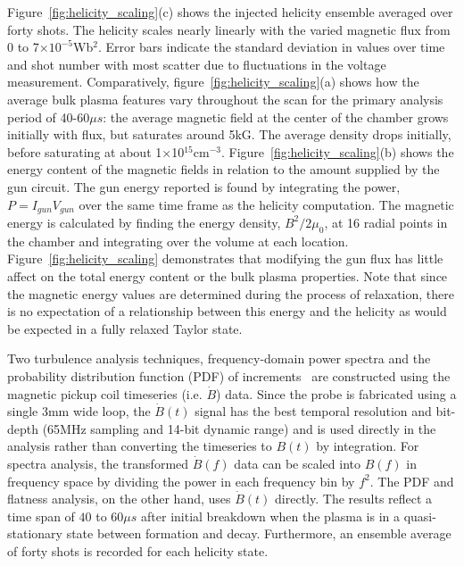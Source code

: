 \documentclass[aps,prl,amsmath,amssymb,reprint,superscriptaddress]{revtex4-1} %
\begin{document}
Figure~\ref{fig:helicity_scaling}(c) shows the injected helicity ensemble averaged over forty shots. The helicity scales nearly linearly with the varied magnetic flux from 0 to 7$\times 10^{-5}$Wb$^2$. Error bars indicate the standard deviation in values over time and shot number with most scatter due to fluctuations in the voltage measurement. Comparatively, figure~\ref{fig:helicity_scaling}(a) shows how the average bulk plasma features vary throughout the scan for the primary analysis period of 40-60$\mu s$: the average magnetic field at the center of the chamber grows initially with flux, but saturates around 5kG. The average density drops initially, before saturating at about 1$\times$10$^{15}$cm$^{-3}$. Figure~\ref{fig:helicity_scaling}(b) shows the energy content of the magnetic fields in relation to the amount supplied by the gun circuit. The gun energy reported is found by integrating the power, $P = I_{gun}V_{gun}$ over the same time frame as the helicity computation. The magnetic energy is calculated by finding the energy density, $B^{2}/2\mu_{0}$, at 16 radial points in the chamber and integrating over the volume at each location. Figure~\ref{fig:helicity_scaling} demonstrates that modifying the gun flux has little affect on the total energy content or the bulk plasma properties. Note that since the magnetic energy values are determined during the process of relaxation, there is no expectation of a relationship between this energy and the helicity as would be expected in a fully relaxed Taylor state.

Two turbulence analysis techniques, frequency-domain power spectra and the probability distribution function (PDF) of increments~\cite{Greco09} are constructed using the magnetic pickup coil timeseries (i.e. $\dot{B}$) data. Since the probe is fabricated using a single 3mm wide loop, the $\dot{B}(t)$ signal has the best temporal resolution and bit-depth (65MHz sampling and 14-bit dynamic range) and is used directly in the analysis rather than converting the timeseries to $B(t)$ by integration. For spectra analysis, the transformed $\dot{B}(f)$ data can be scaled into $B(f)$ in frequency space by dividing the power in each frequency bin by $f^{2}$. The PDF and flatness analysis, on the other hand, uses $\dot{B}(t)$ directly. The results reflect a time span of $40$ to $60 \mu s$ after initial breakdown when the plasma is in a quasi-stationary state between formation and decay. Furthermore, an ensemble average of forty shots is recorded for each helicity state.
\end{document}
